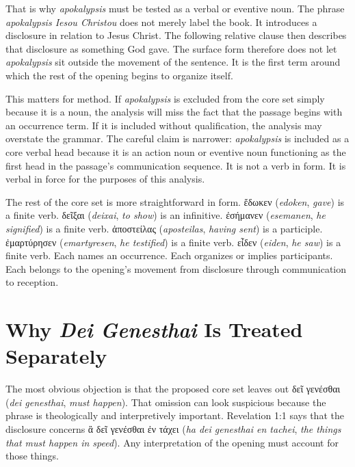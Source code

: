 That is why \textit{apokalypsis} must be tested as a verbal or eventive noun. The phrase \textit{apokalypsis Iesou Christou} does not merely label the book. It introduces a disclosure in relation to Jesus Christ. The following relative clause then describes that disclosure as something God gave. The surface form therefore does not let \textit{apokalypsis} sit outside the movement of the sentence. It is the first term around which the rest of the opening begins to organize itself.

This matters for method. If \textit{apokalypsis} is excluded from the core set simply because it is a noun, the analysis will miss the fact that the passage begins with an occurrence term. If it is included without qualification, the analysis may overstate the grammar. The careful claim is narrower: \textit{apokalypsis} is included as a core verbal head because it is an action noun or eventive noun functioning as the first head in the passage's communication sequence. It is not a verb in form. It is verbal in force for the purposes of this analysis.

The rest of the core set is more straightforward in form. \textgreek{ἔδωκεν} (\textit{edoken}, \textit{gave}) is a finite verb. \textgreek{δεῖξαι} (\textit{deixai}, \textit{to show}) is an infinitive. \textgreek{ἐσήμανεν} (\textit{esemanen}, \textit{he signified}) is a finite verb. \textgreek{ἀποστείλας} (\textit{aposteilas}, \textit{having sent}) is a participle. \textgreek{ἐμαρτύρησεν} (\textit{emartyresen}, \textit{he testified}) is a finite verb. \textgreek{εἶδεν} (\textit{eiden}, \textit{he saw}) is a finite verb. Each names an occurrence. Each organizes or implies participants. Each belongs to the opening's movement from disclosure through communication to reception.

\section{Why \textit{Dei Genesthai} Is Treated Separately}

The most obvious objection is that the proposed core set leaves out \textgreek{δεῖ γενέσθαι} (\textit{dei genesthai}, \textit{must happen}). That omission can look suspicious because the phrase is theologically and interpretively important. Revelation 1:1 says that the disclosure concerns \textgreek{ἃ δεῖ γενέσθαι ἐν τάχει} (\textit{ha dei genesthai en tachei}, \textit{the things that must happen in speed}). Any interpretation of the opening must account for those things.

